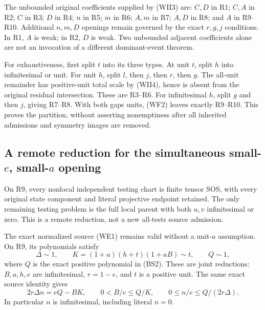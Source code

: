 The unbounded original coefficients supplied by (WII3) are:
$C,D$ in R1; $C,A$ in R2; $C$ in R3; $D$ in R4;
$n$ in R5; $m$ in R6; $A,m$ in R7; $A,D$ in R8;
and $A$ in R9--R10. Additional $n,m,D$ openings remain governed
by the exact $r,g,j$ conditions. In R1, $A$ is weak; in R2, $D$
is weak. Two unbounded adjacent coefficients alone are not an
invocation of a different dominant-event theorem.

For exhaustiveness, first split $t$ into its three types. At unit
$t$, split $h$ into infinitesimal or unit. For unit $h$, split $l$,
then $j$, then $r$, then $g$. The all-unit remainder has
positive-unit total scale by (WII4), hence is absent from the
original residual intersection. These are R3--R6.
For infinitesimal $h$, split $g$ and then $j$, giving R7--R8.
With both gaps units, (WF2) leaves exactly R9--R10. This proves
the partition, without asserting nonemptiness after all inherited
admissions and symmetry images are removed.

\subsection{A remote reduction for the simultaneous small-$e$, small-$a$ opening}
\label{pe2fc3cbe3819:sec:r13-joint-a-e-remote}

\begin{lemma}
On R9, every nonlocal independent testing chart is finite tensor
SOS, with every original state component and literal projective
endpoint retained. The only remaining testing problem is the full
local parent with both $u,v$ infinitesimal or zero. This is a remote
reduction, not a new all-tests source admission.
\end{lemma}

The exact normalized source (WE1) remains valid without a unit-$a$
assumption. On R9, its polynomials satisfy
\[
 \Delta\sim1,\qquad
 K=(1+a)(h+t)(1+aB)\sim t,\qquad Q\sim1,               \tag{WF4}
\]
where $Q$ is the exact positive polynomial in (BS2). These are
joint reductions: $B,a,h,e$ are infinitesimal, $r=1-e$, and $t$
is a positive unit. The same exact source identity gives
\[
 2r\Delta n=eQ-BK,\qquad
 0<B/e\le Q/K,\qquad 0\le n/e\le Q/(2r\Delta).        \tag{WF5}
\]
In particular $n$ is infinitesimal, including literal $n=0$.

